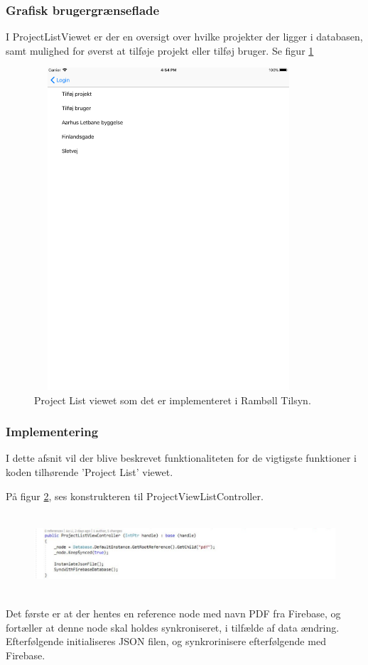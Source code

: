 \subsubsection{Grafisk brugergrænseflade}
I ProjectListViewet er der en oversigt over hvilke projekter der ligger i databasen, samt mulighed for øverst at tilføje projekt eller tilføj bruger. Se figur \ref{fig:ProjectListView}
\begin{figure}[H] %
	\centering
	\includegraphics[height=12cm, width=10cm]{../ArkitekturDesign/Design/ProjectList/ProjectList}
	\caption{Project List viewet som det er implementeret i Rambøll Tilsyn.}
	\label{fig:ProjectListView}
\end{figure}

\clearpage

\subsubsection{Implementering}
I dette afsnit vil der blive beskrevet funktionaliteten for de vigtigste funktioner i koden tilhørende 'Project List' viewet.

På figur \ref{fig:ProjectListViewController}, ses konstrukteren til ProjectViewListController.
\begin{figure}[H] %
	\centering
	\includegraphics[height=3cm, width=17cm]{../ArkitekturDesign/Design/ProjectList/ProjectListViewController}
	\caption{}
	\label{fig:ProjectListViewController}
\end{figure}
Det første er at der hentes en reference node med navn PDF fra Firebase, og fortæller at denne node skal holdes synkroniseret, i tilfælde af data ændring. \\
Efterfølgende initialiseres JSON filen, og synkrorinisere efterfølgende med Firebase.

